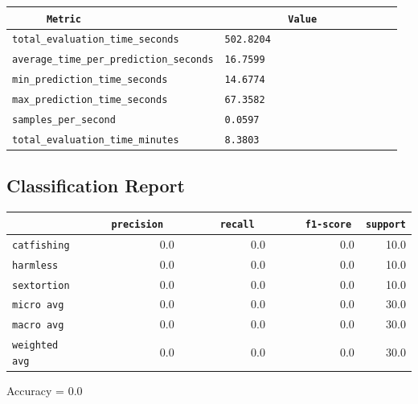 \documentclass{article}
\begin{document}
\begin{center}
\begin{tabular}{l | l} \hline
    \verb|      Metric     | & \verb|           Value           | \\ \hline
    \hline
    \verb|total_evaluation_time_seconds| & \verb|502.8204                     | \\ \hline
    \verb|average_time_per_prediction_seconds| & \verb|16.7599                      | \\ \hline
    \verb|min_prediction_time_seconds| & \verb|14.6774                      | \\ \hline
    \verb|max_prediction_time_seconds| & \verb|67.3582                      | \\ \hline
    \verb|samples_per_second| & \verb|0.0597                       | \\ \hline
    \verb|total_evaluation_time_minutes| & \verb|8.3803                       | \\ \hline
\end{tabular}
\end{center}

\subsection{Classification Report}

\begin{center}
\begin{tabular}{l | r | r | r | r} \hline
    \verb|            | & \verb|    precision     | & \verb|      recall      | & \verb|     f1-score     | & \verb|support| \\ \hline
    \hline
    \verb|catfishing | & 0.0 & 0.0 & 0.0 &    10.0 \\ \hline
    \verb|harmless   | & 0.0 & 0.0 & 0.0 &    10.0 \\ \hline
    \verb|sextortion | & 0.0 & 0.0 & 0.0 &    10.0 \\ \hline
    \verb|micro avg  | & 0.0 & 0.0 & 0.0 &    30.0 \\ \hline
    \verb|macro avg  | & 0.0 & 0.0 & 0.0 &    30.0 \\ \hline
    \verb|weighted avg| & 0.0 & 0.0 & 0.0 &    30.0 \\ \hline
\end{tabular}
\end{center}

\begin{center}
Accuracy = 0.0
\end{center}
\end{document}
